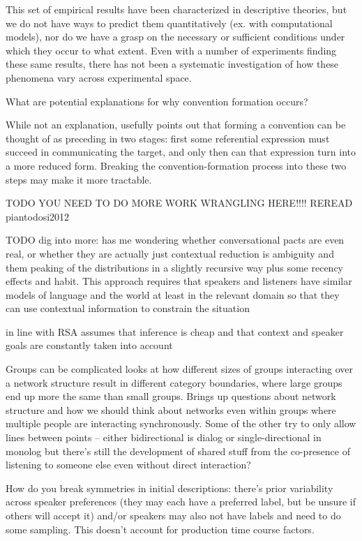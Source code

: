 \documentclass[]{article}
\begin{document}
This set of empirical results have been characterized in descriptive theories, but we do not have ways to predict them quantitatively (ex. with computational models), nor do we have a grasp on the necessary or sufficient conditions under which they occur to what extent. Even with a number of experiments finding these same results, there has not been a systematic investigation of how these phenomena vary across experimental space. 

What are potential explanations for why convention formation occurs?

While not an explanation, \cite{leung2023} usefully points out that forming a convention can be thought of as preceding in two stages: first some referential expression must succeed in communicating the target, and only then can that expression turn into a more reduced form. Breaking the convention-formation process into these two steps may make it more tractable. 

TODO YOU NEED TO DO MORE WORK WRANGLING HERE!!!!
REREAD piantodosi2012 

TODO dig into more: \cite{piantadosi2012} has me wondering whether conversational pacts are even real, or whether they are actually just contextual reduction is ambiguity and them peaking of the distributions in a slightly recursive way plus some recency effects and habit. This approach requires that speakers and listeners have similar models of language and the world at least in the relevant domain so that they can use contextual information to constrain the situation 

\cite{piantadosi2012} in line with RSA assumes that inference is cheap and that context and speaker goals are constantly taken into account 

Groups can be complicated \cite{guilbeault2021} looks at how different sizes of groups interacting over a network structure result in different category boundaries, where large groups end up more the same than small groups. Brings up questions about network structure and how we should think about networks even within groups where multiple people are interacting synchronously. Some of the other try to only allow lines between points -- either bidirectional is dialog or single-directional in monolog but there's still the development of shared stuff from the co-presence of listening to someone else even without direct interaction? 


\cite{hawkins2020b} How do you break symmetries in initial descriptions: there's prior variability across speaker preferences (they may each have a preferred label, but be unsure if others will accept it) and/or speakers may also not have labels and need to do some sampling. This doesn't account for production time course factors. 
\end{document}
